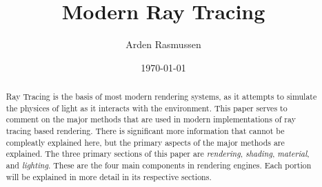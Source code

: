 \documentclass[10pt]{amsart}
\title{Modern Ray Tracing}
\author{Arden Rasmussen}
\date{\today}
\begin{document}
\maketitle

\begin{abstract}
  Ray Tracing is the basis of most modern rendering systems, as it attempts to
  simulate the physices of light as it interacts with the environment. This
  paper serves to comment on the major methods that are used in modern
  implementations of ray tracing based rendering. There is significant more
  information that cannot be compleatly explained here, but the primary aspects
  of the major methods are explained. The three primary sections of this paper
  are \textit{rendering}, \textit{shading}, \textit{material}, and
  \textit{lighting}. These are the four main components in rendering engines.
  Each portion will be explained in more detail in its respective sections.
\end{abstract}

\begin{multicols}{2}
  
\end{multicols}
\end{document}
